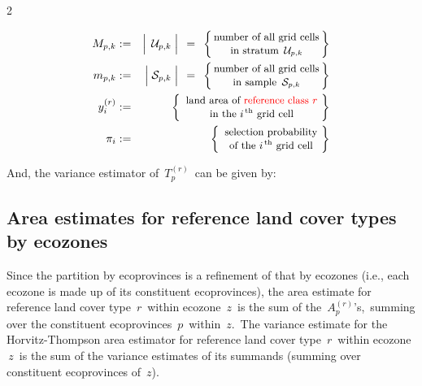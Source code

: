 \begin{multicols}{2}
    \begin{center}
    \begin{minipage}{3.25in}
    \begin{eqnarray*}
    M_{p,k}
    & := &
        \left\vert\;\,\overset{{\color{white}.}}{\mathcal{U}_{p,k}}\;\right\vert
    \;\, = \;\,
        \left\{\!\!\begin{array}{c}
        \textnormal{\small number of all grid cells}
        \\
        \textnormal{\small in stratum \,$\mathcal{U}_{p,k}$}
        \end{array}\!\!\right\}
    \\
    m_{p,k}
    & := &
        \left\vert\;\overset{{\color{white}.}}{\mathcal{S}_{p,k}}\;\right\vert
    \;\, = \;\,
        \left\{\!\!\begin{array}{c}
        \textnormal{\small number of all grid cells}
        \\
        \textnormal{\small in sample \,$\mathcal{S}_{p,k}$}
        \end{array}\!\!\right\}
    \\
    y^{(r)}_{i}
    & := &
        \left\{\begin{array}{c}
        \textnormal{\small land area of {\color{red}reference class $r$}}
        \\
        \textnormal{\small in the $i^{\textnormal{\,th}}$ grid cell}
        \end{array}\!\right\}
    \\
    \pi_{i}
    & := &
        \left\{\begin{array}{c}
        \textnormal{\small selection probability}
        \\
        \textnormal{\small of the $i^{\textnormal{\,th}}$ grid cell}
        \end{array}\!\right\}
    \end{eqnarray*}
    \end{minipage}
    \end{center}

\end{multicols}
\noindent
And, the variance estimator of \,$T^{(r)}_{p}$\, can be given by:



\subsection{Area estimates for reference land cover types by ecozones}
Since the partition by ecoprovinces is a refinement of that by ecozones
(i.e., each ecozone is made up of its constituent ecoprovinces),
the area estimate for reference land cover type \,$r$\,
within ecozone \,$z$\, is the sum of the
\,$A_{p}^{(r)}$'s,\,
summing over the constituent ecoprovinces \,$p$\, within \,$z$.\,
The variance estimate for the Horvitz-Thompson area estimator for reference land 
cover type \,$r$\, within ecozone \,$z$\, is the sum of the variance estimates of its summands 
(summing over constituent ecoprovinces of \,$z$). 

